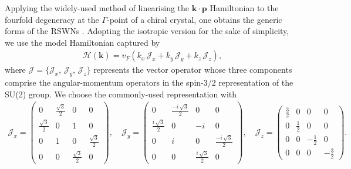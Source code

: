 \documentclass[aps,prb,onecolumn,nofootinbib,citeautoscript,10pt, showkeys]{revtex4-2}
\begin{document}
 
Applying the widely-used method of linearising the $\boldsymbol{k} \cdot \boldsymbol {p}$ Hamiltonian to the fourfold degeneracy at the $\Gamma$-point of a chiral crystal, one obtains the generic forms of the RSWNs \cite{multifold-rhsi, xu2020_optical}. Adopting the isotropic version for the sake of simplicity, we use the model Hamiltonian captured by
\begin{align}
	\mathcal{H}(\boldsymbol{k}) =  v_F \left( k_x\,	{\mathcal J }_x + k_y\, {\mathcal J }_y
+  k_z \, {\mathcal J }_z \right),
\end{align}
where $ \boldsymbol{\mathcal J } = \lbrace {\mathcal J }_x,\, {\mathcal J }_y,\, {\mathcal J }_z \rbrace $ represents the vector operator whose three components comprise the angular-momentum operators in the spin-$3/2$ representation of the SU(2) group. We choose the commonly-used representation with
\begin{align}
{\mathcal J }_x= 
\begin{pmatrix}
	0 & \frac{\sqrt{3}}{2} & 0 & 0 \\
	\frac{\sqrt{3}}{2} & 0 & 1 & 0 \\
	0 & 1 & 0 & \frac{\sqrt{3}}{2} \\
	0 & 0 & \frac{\sqrt{3}}{2} & 0 
\end{pmatrix} , \quad
{\mathcal J }_y=
\begin{pmatrix}
	0 & \frac{-i \,  \sqrt{3}}{2}  & 0 & 0 \\
	\frac{i \, \sqrt{3}}{2} & 0 & -i & 0 \\
	0 & i & 0 & \frac{-i \, \sqrt{3}}{2}  \\
	0 & 0 & \frac{i \, \sqrt{3}}{2} & 0 
\end{pmatrix}, \quad
{\mathcal J }_z =
\begin{pmatrix}
	\frac{3}{2} & 0 & 0 & 0 \\
	0 & \frac{1}{2} & 0 & 0 \\
	0 & 0 & -\frac{1}{2} & 0 \\
	0 & 0 & 0 & -\frac{3}{2} 
\end{pmatrix}.
\end{align}
\end{document}
